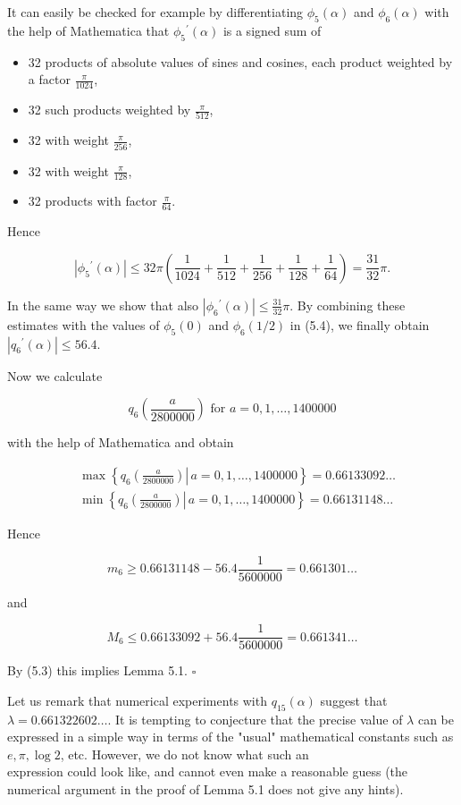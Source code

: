 \documentclass[10pt]{article}
\newcommand{\1}{\mathbf{1}}
\begin{document}
It can easily be checked for example by differentiating $\phi_{5}(\alpha)$ and $\phi_{6}(\alpha)$ with the help of Mathematica that $\phi_{5}{ }^{\prime}(\alpha)$ is a signed sum of

\begin{itemize}
  \item[-] 32 products of absolute values of sines and cosines, each product weighted by a factor $\frac{\pi}{1024}$,
  \item[-] 32 such products weighted by $\frac{\pi}{512}$,
  \item[-] 32 with weight $\frac{\pi}{256}$,
  \item[-] 32 with weight $\frac{\pi}{128}$,
  \item[-] 32 products with factor $\frac{\pi}{64}$.
\end{itemize}

Hence

$$
\left|\phi_{5}{ }^{\prime}(\alpha)\right| \leqslant 32 \pi\left(\frac{1}{1024}+\frac{1}{512}+\frac{1}{256}+\frac{1}{128}+\frac{1}{64}\right)=\frac{31}{32} \pi .
$$

In the same way we show that also $\left|\phi_{6}{ }^{\prime}(\alpha)\right| \leqslant \frac{31}{32} \pi$. By combining these estimates with the values of $\phi_{5}(0)$ and $\phi_{6}(1 / 2)$ in (5.4), we finally obtain $\left|q_{6}{ }^{\prime}(\alpha)\right| \leqslant 56.4$.

Now we calculate

$$
q_{6}\left(\frac{a}{2800000}\right) \text{ for } a=0,1, \ldots, 1400000
$$

with the help of Mathematica and obtain

$$
\begin{aligned}
& \max \left\{\left.q_{6}\left(\frac{a}{2800000}\right) \right\rvert\, a=0,1, \ldots, 1400000\right\}=0.66133092 \ldots \\
& \min \left\{\left.q_{6}\left(\frac{a}{2800000}\right) \right\rvert\, a=0,1, \ldots, 1400000\right\}=0.66131148 \ldots
\end{aligned}
$$

Hence

$$
m_{6} \geqslant 0.66131148-56.4 \frac{1}{5600000}=0.661301 \ldots
$$

and

$$
M_{6} \leqslant 0.66133092+56.4 \frac{1}{5600000}=0.661341 \ldots
$$

By (5.3) this implies Lemma 5.1. \(\square\)

Let us remark that numerical experiments with $q_{15}(\alpha)$ suggest that $\lambda=0.661322602\ldots$. It is tempting to conjecture that the precise value of $\lambda$ can be expressed in a simple way in terms of the "usual" mathematical constants such as $e, \pi, \log 2$, etc. However, we do not know what such an\\
expression could look like, and cannot even make a reasonable guess (the numerical argument in the proof of Lemma 5.1 does not give any hints).
\end{document}
